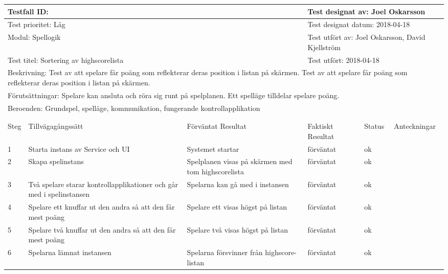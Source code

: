 

\begin{tabular}{| p{1cm}|  p{3cm} | p{3cm}| p{3cm}| p{2cm}| p{3cm}|}
	\hline
	\multicolumn{3}{|l|}{Testfall ID:}&\multicolumn{3}{|l|}{Test designat av: Joel Oskarsson}\\
	\hline
	\multicolumn{3}{|l|}{Test prioritet: Låg}&\multicolumn{3}{|l|}{Test designat datum: 2018-04-18}\\
	\hline
	\multicolumn{3}{|l|}{Modul: Spellogik}&\multicolumn{3}{|l|}{Test utfört av: Joel Oskarsson, David Kjellström}\\
	\hline
	\multicolumn{3}{|l|}{Test titel: Sortering av highscorelista}&\multicolumn{3}{|l|}{Test utfört: 2018-04-18}\\
	\hline
	\multicolumn{6}{|p{\textwidth}|}{Beskrivning: Test av att spelare får poäng som reflekterar deras position i listan på skärmen. Test av att spelare får poäng som reflekterar deras position i listan på skärmen.}\\
	\hline
	\multicolumn{6}{|l|}{Förutsättningar: Spelare kan ansluta och röra sig runt på spelplanen. Ett spelläge tilldelar spelare poäng.}\\
	\hline
	\multicolumn{6}{|l|}{Beroenden: Grundspel, spelläge, kommunikation, fungerande kontrollapplikation}\\

	\hline
	\multicolumn{6}{|l|}{}\\
	\multicolumn{6}{|l|}{}\\
      	\hline
	Steg&Tillvägagångssätt&Förväntat Resultat&Faktiskt Resultat&Status&Anteckningar \\
	\hline
	1& Starta instans av Service och UI & Systemet startar & förväntat & ok &\\
      	\hline
	2& Skapa spelinstans & Spelplanen visas på skärmen med tom highscorelista & förväntat & ok &\\
      	\hline
	3& Två spelare starar kontrollapplikationer och går med i spelinstansen & Spelarna kan gå med i instansen & förväntat & ok &\\
      	\hline
  4& Spelare ett knuffar ut den andra så att den får mest poäng & Spelare ett visas högst på listan & förväntat & ok & \\ \hline
  5& Spelare två knuffar ut den andra så att den får mest poäng & Spelare två visas högst på listan & förväntat & ok & \\ \hline
  6& Spelarna lämnat instansen & Spelarna försvinner från highscore-listan & förväntat & ok & \\ \hline
\end{tabular}




